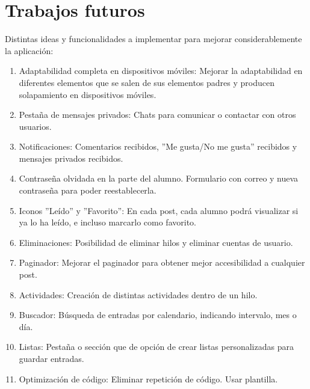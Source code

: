 \documentclass[a4paper, 12pt]{book}
\begin{document}
\section{Trabajos futuros}
\label{sec:trabajos_futuros}
Distintas ideas y funcionalidades a implementar para mejorar considerablemente la aplicaci\'on:
\begin{enumerate}
  \item Adaptabilidad completa en dispositivos m\'oviles: Mejorar la adaptabilidad en diferentes elementos que se salen de sus elementos padres y producen solapamiento en
  dispositivos m\'oviles.
  \item	Pesta\~na de mensajes privados: Chats para comunicar o contactar con otros usuarios.
  \item Notificaciones: Comentarios recibidos, ''Me gusta/No me gusta'' recibidos y mensajes privados recibidos.
  \item Contrase\~na olvidada en la parte del alumno. Formulario con correo y nueva contrase\~na para poder reestablecerla.
  \item Iconos ''Le\'ido'' y ''Favorito'': En cada post, cada alumno podr\'a visualizar si ya lo ha le\'ido, e incluso marcarlo como favorito.
  \item Eliminaciones: Posibilidad de eliminar hilos y eliminar cuentas de usuario.
  \item Paginador: Mejorar el paginador para obtener mejor accesibilidad a cualquier post.
  \item Actividades: Creaci\'on de distintas actividades dentro de un hilo.
  \item Buscador: B\'usqueda de entradas por calendario, indicando intervalo, mes o d\'ia.
  \item Listas: Pesta\~na o secci\'on que de opci\'on de crear listas personalizadas para guardar entradas.
  \item Optimizaci\'on de c\'odigo: Eliminar repetici\'on de c\'odigo. Usar plantilla.
\end{enumerate}




\cleardoublepage
\end{document}

